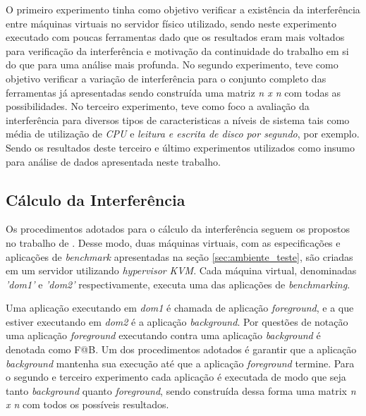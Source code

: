 O primeiro experimento tinha como objetivo verificar a existência da interferência entre máquinas virtuais no servidor físico utilizado, sendo neste experimento executado com poucas ferramentas dado que os resultados eram mais voltados para verificação da interferência e motivação da continuidade do trabalho em si do que para uma análise mais profunda. No segundo experimento, teve como objetivo verificar a variação de interferência para o conjunto completo das ferramentas já apresentadas sendo construída uma matriz \textit{n x n} com todas as possibilidades. No terceiro experimento, teve como foco a avaliação da interferência para diversos tipos de caracteristicas a níveis de sistema tais como média de utilização de \textit{CPU} e \textit{leitura e escrita de disco por segundo}, por exemplo. Sendo os resultados deste terceiro e último experimentos utilizados como insumo para análise de dados apresentada neste trabalho.%

\subsection{Cálculo da Interferência}
Os procedimentos adotados para o cálculo da interferência seguem os propostos no trabalho de . Desse modo, duas máquinas virtuais, com as especificações e aplicações de \textit{benchmark} apresentadas na seção \ref{sec:ambiente_teste}, são criadas em um servidor utilizando \textit{hypervisor} \textit{KVM}. Cada máquina virtual, denominadas \textit{'dom1'} e \textit{'dom2'} respectivamente, executa uma das aplicações de \textit{benchmarking}. 

Uma aplicação executando em \textit{dom1} é chamada de aplicação \textit{foreground}, e a que estiver executando em \textit{dom2} é a aplicação \textit{background}. Por questões de notação uma aplicação \textit{foreground} executando contra uma aplicação \textit{background} é denotada como F@B. Um dos procedimentos adotados é garantir que a aplicação \textit{background} mantenha sua execução até que a aplicação \textit{foreground} termine. Para o segundo e terceiro experimento cada aplicação é executada de modo que seja tanto \textit{background} quanto \textit{foreground}, sendo construída dessa forma uma matrix \textit{n x n} com todos os possíveis resultados. %

